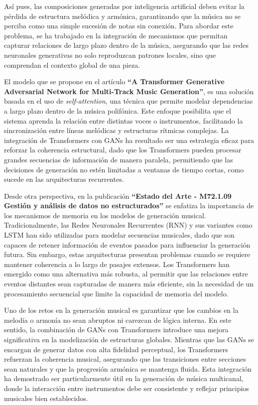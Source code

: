 Así pues, las composiciones generadas por inteligencia artificial deben evitar la pérdida de estructura melódica y armónica, garantizando que la música no se perciba como una simple sucesión de notas sin conexión. Para abordar este problema, se ha trabajado en la integración de mecanismos que permitan capturar relaciones de largo plazo dentro de la música, asegurando que las redes neuronales generativas no solo reproduzcan patrones locales, sino que comprendan el contexto global de una pieza. 

El modelo que se propone en el artículo \textbf{``A Transformer Generative Adversarial Network for Multi-Track Music Generation''}\citep{jin2022transformer}, es una solución basada en el uso de \emph{self-attention}, una técnica que permite modelar dependencias a largo plazo dentro de la música polifónica. Este enfoque posibilita que el sistema aprenda la relación entre distintas voces o instrumentos, facilitando la sincronización entre líneas melódicas y estructuras rítmicas complejas. La integración de Transformers con GANs ha resultado ser una estrategia eficaz para reforzar la coherencia estructural, dado que los Transformers pueden procesar grandes secuencias de información de manera paralela, permitiendo que las decisiones de generación no estén limitadas a ventanas de tiempo cortas, como sucede en las arquitecturas recurrentes. 

Desde otra perspectiva, en la publicación \textbf{``Estado del Arte - M72.1.09 Gestión y análisis de datos no estructurados''}\citep{state_of_the_art2023} se enfatiza la importancia de los mecanismos de memoria en los modelos de generación musical. Tradicionalmente, las Redes Neuronales Recurrentes (RNN) y sus variantes como LSTM han sido utilizadas para modelar secuencias musicales, dado que son capaces de retener información de eventos pasados para influenciar la generación futura. Sin embargo, estas arquitecturas presentan problemas cuando se requiere mantener coherencia a lo largo de pasajes extensos. Los Transformers han emergido como una alternativa más robusta, al permitir que las relaciones entre eventos distantes sean capturadas de manera más eficiente, sin la necesidad de un procesamiento secuencial que limite la capacidad de memoria del modelo.

Uno de los retos en la generación musical es garantizar que los cambios en la melodía o armonía no sean abruptos ni carezcan de lógica interna. En este sentido, la combinación de GANs con Transformers introduce una mejora significativa en la modelización de estructuras globales. Mientras que las GANs se encargan de generar datos con alta fidelidad perceptual, los Transformers refuerzan la coherencia musical, asegurando que las transiciones entre secciones sean naturales y que la progresión armónica se mantenga fluida. Esta integración ha demostrado ser particularmente útil en la generación de música multicanal, donde la interacción entre instrumentos debe ser consistente y reflejar principios musicales bien establecidos.

